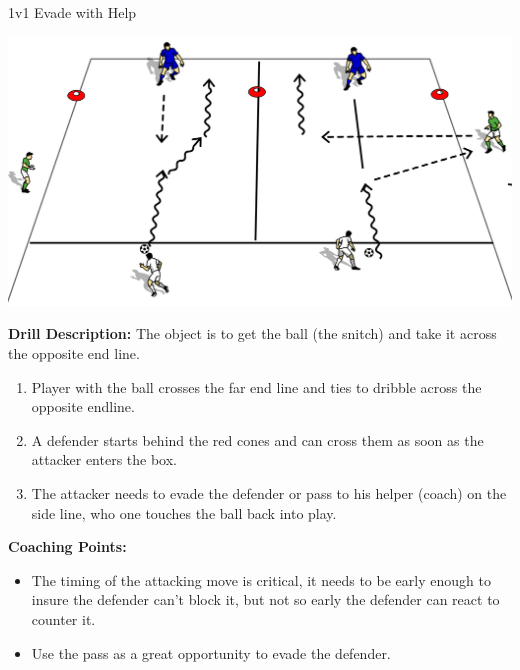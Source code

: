 \begin{evenBlock}{1v1 Evade with Help}

\begin{minipage}[t]{\linewidth}
    \centering
    
    \begin{minipage}{.5\linewidth} %
        \includegraphics[width=\textwidth]{../img/Trimmed/Evade_1V1+Help}
    \end{minipage}
    \hspace{0.05\linewidth}
    \begin{minipage}{.4\linewidth} %
        \textbf{Drill Description:}
        The object is to get the ball (the snitch) and take it across the opposite end line.
        \begin{enumerate}
            \setlength{\itemsep}{0pt}
            \setlength{\parskip}{0pt}
            \setlength{\parsep}{0pt}
            \item Player with the ball crosses the far end line and ties to dribble across the opposite endline.
            \item A defender starts behind the red cones and can cross them as soon as the attacker enters the box.
            \item The attacker needs to evade the defender or pass to his helper (coach) on the side line, who one touches the ball back into play.
        \end{enumerate}
    \end{minipage}
\end{minipage}
\vspace{12pt}

\textbf{Coaching Points:}
\begin{itemize}
    \setlength{\itemsep}{0pt}
    \setlength{\parskip}{0pt}
    \setlength{\parsep}{0pt}
    \item The timing of the attacking move is critical, it needs to be early enough to insure the defender can't block it, but not so early the defender can react to counter it.
    \item Use the pass as a great opportunity to evade the defender.
\end{itemize}
\end{evenBlock}